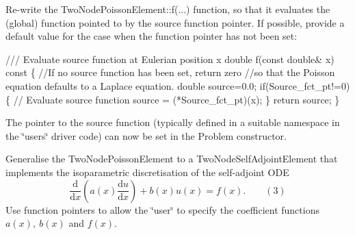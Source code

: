 \begin{DoxyItemize}
\begin{DoxyItemize}
\item Re-\/write the {\ttfamily Two\+Node\+Poisson\+Element\+::f}(...) function, so that it evaluates the (global) function pointed to by the source function pointer. If possible, provide a default value for the case when the function pointer has not been set\+: 
\begin{DoxyCode}
\textcolor{comment}{/// Evaluate source function at Eulerian position x}
\textcolor{comment}{}\textcolor{keywordtype}{double} f(\textcolor{keyword}{const} \textcolor{keywordtype}{double}& x)\textcolor{keyword}{ const}
\textcolor{keyword}{ }\{ 
  \textcolor{comment}{//If no source function has been set, return zero}
  \textcolor{comment}{//so that the Poisson equation defaults to a Laplace equation.}
  \textcolor{keywordtype}{double} source=0.0;
  \textcolor{keywordflow}{if}(Source\_fct\_pt!=0)
   \{
    \textcolor{comment}{// Evaluate source function }
    source = (*Source\_fct\_pt)(x);
   \}
  \textcolor{keywordflow}{return} source;
 \}
\end{DoxyCode}

\end{DoxyItemize}The pointer to the source function (typically defined in a suitable namespace in the \char`\"{}user\textquotesingle{}s\char`\"{} driver code) can now be set in the Problem constructor.
\item Generalise the {\ttfamily Two\+Node\+Poisson\+Element} to a {\ttfamily Two\+Node\+Self\+Adjoint\+Element} that implements the isoparametric discretisation of the self-\/adjoint O\+DE \[ \frac{\mbox{d}}{\mbox{d}x} \left( a(x) \frac{\mbox{d}u}{\mbox{d}x} \right) + b(x) u(x) = f(x). \ \ \ \ \ \ \ \ \ (3) \] Use function pointers to allow the \char`\"{}user\char`\"{} to specify the coefficient functions $ a(x), \ b(x) $ and $ f(x) $.
\end{DoxyItemize}



